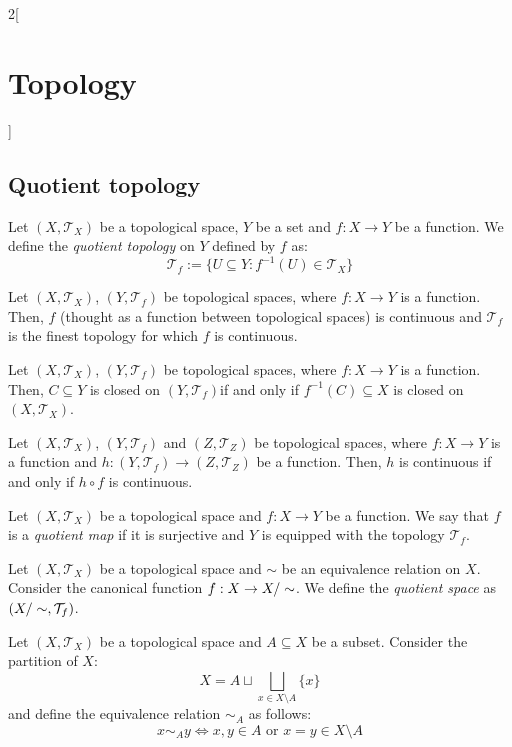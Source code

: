 \documentclass[../../../main.tex]{subfiles}
\begin{document}
\begin{multicols}{2}[\section{Topology}]
  \subsection{Quotient topology}
  \begin{definition}
    Let $(X,\mathcal{T}_X)$ be a topological space, $Y$ be a set and $f:X\rightarrow Y$ be a function. We define the \textit{quotient topology} on $Y$ defined by $f$ as: $$\mathcal{T}_f:=\{U\subseteq Y:f^{-1}(U)\in\mathcal{T}_X\}$$
  \end{definition}
  \begin{prop}
    Let $(X,\mathcal{T}_X)$, $(Y,\mathcal{T}_f)$ be topological spaces, where $f:X\rightarrow Y$ is a function. Then, $f$ (thought as a function between topological spaces) is continuous and $\mathcal{T}_f$ is the finest topology for which $f$ is continuous.
  \end{prop}
  \begin{prop}
    Let $(X,\mathcal{T}_X)$, $(Y,\mathcal{T}_f)$ be topological spaces, where $f:X\rightarrow Y$ is a function. Then, $C\subseteq Y$ is closed on $(Y,\mathcal{T}_f)$if and only if $f^{-1}(C)\subseteq X$ is closed on $(X,\mathcal{T}_X)$.
  \end{prop}
  \begin{prop}
    Let $(X,\mathcal{T}_X)$, $(Y,\mathcal{T}_f)$ and $(Z,\mathcal{T}_Z)$ be topological spaces, where $f:X\rightarrow Y$ is a function and $h:(Y,\mathcal{T}_f)\rightarrow(Z,\mathcal{T}_Z)$ be a function. Then, $h$ is continuous if and only if $h\circ f$ is continuous.
  \end{prop}
  \begin{definition}
    Let $(X,\mathcal{T}_X)$ be a topological space and $f:X\rightarrow Y$ be a function. We say that $f$ is a \textit{quotient map} if it is surjective and $Y$ is equipped with the topology $\mathcal{T}_f$.
  \end{definition}
  \begin{definition}
    Let $(X,\mathcal{T}_X)$ be a topological space and $\sim$ be an equivalence relation on $X$. Consider the canonical function $f:X\rightarrow\quot{X}{\sim}$. We define the \textit{quotient space} as $(\quot{X}{\sim},\mathcal{T}_f)$.
  \end{definition}
  \begin{definition}
    Let $(X,\mathcal{T}_X)$ be a topological space and $A\subseteq X$ be a subset. Consider the partition of $X$: $$X=A\sqcup\bigsqcup_{x\in X\setminus A}\{x\}$$
    and define the equivalence relation $\sim_A$ as follows: $$x\sim_A y\iff x,y\in A\text{ or }x=y\in X\setminus A$$

\end{definition}
\end{multicols}
\end{document}
